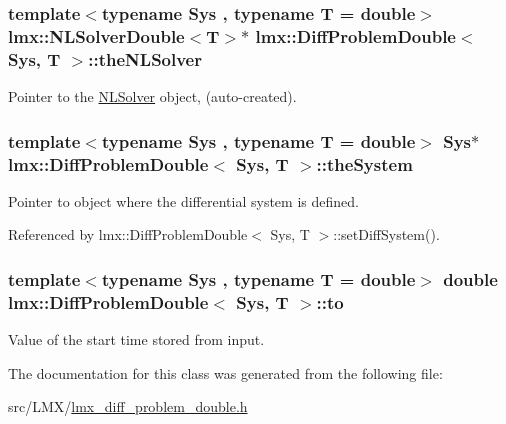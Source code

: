 \hypertarget{classlmx_1_1DiffProblemDouble_aec50fd5565c52bcb97854648d8b7090b}{
\subsubsection[{the\-N\-L\-Solver}]{\setlength{\rightskip}{0pt plus 5cm}template$<$typename Sys , typename T  = double$>$ {\bf lmx\-::\-N\-L\-Solver\-Double}$<$T$>$$\ast$ {\bf lmx\-::\-Diff\-Problem\-Double}$<$ Sys, T $>$\-::the\-N\-L\-Solver\hspace{0.3cm}{\ttfamily [protected]}}}\label{classlmx_1_1DiffProblemDouble_aec50fd5565c52bcb97854648d8b7090b}


Pointer to the \hyperlink{classlmx_1_1NLSolver}{N\-L\-Solver} object, (auto-\/created). 

\hypertarget{classlmx_1_1DiffProblemDouble_ad53a4d138b69f0e7c0c9c758f736002c}{
\subsubsection[{the\-System}]{\setlength{\rightskip}{0pt plus 5cm}template$<$typename Sys , typename T  = double$>$ Sys$\ast$ {\bf lmx\-::\-Diff\-Problem\-Double}$<$ Sys, T $>$\-::the\-System\hspace{0.3cm}{\ttfamily [protected]}}}\label{classlmx_1_1DiffProblemDouble_ad53a4d138b69f0e7c0c9c758f736002c}


Pointer to object where the differential system is defined. 



Referenced by lmx\-::\-Diff\-Problem\-Double$<$ Sys, T $>$\-::set\-Diff\-System().

\hypertarget{classlmx_1_1DiffProblemDouble_a19b2a71c676c67ee71de28fde7c97d54}{
\subsubsection[{to}]{\setlength{\rightskip}{0pt plus 5cm}template$<$typename Sys , typename T  = double$>$ double {\bf lmx\-::\-Diff\-Problem\-Double}$<$ Sys, T $>$\-::to\hspace{0.3cm}{\ttfamily [protected]}}}\label{classlmx_1_1DiffProblemDouble_a19b2a71c676c67ee71de28fde7c97d54}


Value of the start time stored from input. 



The documentation for this class was generated from the following file\-:\begin{DoxyCompactItemize}
\item 
src/\-L\-M\-X/\hyperlink{lmx__diff__problem__double_8h}{lmx\-\_\-diff\-\_\-problem\-\_\-double.\-h}\end{DoxyCompactItemize}
